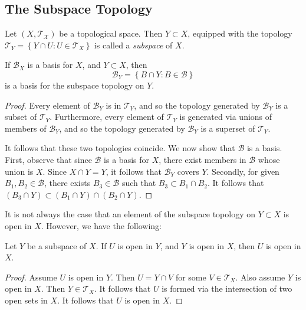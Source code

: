 \subsection{The Subspace Topology}
\begin{definition}
\label{def:subspace-top}
Let $(X, \mathcal{T_{X}})$ be a topological space. Then $Y \subset X$,
equipped with the topology $\mathcal{T}_{Y} = \left\{ Y \cap U: U \in
\mathcal{T}_{X} \right\}$ is called a \emph{subspace} of $X$.
\end{definition}
\begin{lemma}
\label{lem:basis-subspace}
If $\mathcal{B}_{X}$ is a basis for $X$, and $Y \subset X$, then
\begin{equation*}
\mathcal{B}_{Y} = \left\{ B \cap Y: B \in \mathcal{B} \right\}
\end{equation*}
is a basis for the subspace topology on $Y$.
\end{lemma}
\begin{proof}
Every element of $\mathcal{B}_{Y}$ is in $\mathcal{T}_{Y}$, and so
the topology generated by $\mathcal{B}_{Y}$ is a subset of
$\mathcal{T}_{Y}$. Furthermore, every element of $\mathcal{T}_{Y}$
is generated via unions of members of $\mathcal{B}_{Y}$, and so
the topology generated by $\mathcal{B}_{Y}$ is a superset of
$\mathcal{T}_{Y}$.

It follows that these two topologies coincide. We now show that $\mathcal{B}$
is a basis. First, observe that since $\mathcal{B}$ is a
basis for $X$, there exist members in $\mathcal{B}$ whose union is $X$. Since
$X \cap Y = Y$, it follows that $\mathcal{B}_{Y}$ covers $Y$. Secondly,
for given $B_{1}, B_{2} \in \mathcal{B}$, there exists $B_{3} \in \mathcal{B}$
such that $B_{3} \subset B_{1} \cap B_{2}$. It follows that
$\left( B_{3} \cap Y  \right)\subset (B_{1} \cap Y) \cap (B_{2} \cap Y)$.
\end{proof}
It is not always the case that an element of the subspace topology on $Y \subset
X$ is open in $X$. However, we have the following:
\begin{lemma}
\label{lem:open-criteria-subspace}
Let $Y$ be a subspace of $X$. If $U$ is open in $Y$, and $Y$ is open in
$X$, then $U$ is open in $X$.
\end{lemma}
\begin{proof}
Assume $U$ is open in $Y$. Then $U = Y \cap V$ for some $V \in
\mathcal{T}_{X}$. Also assume $Y$ is open in $X$. Then $Y \in \mathcal{T}_{X}$.
It follows that $U$ is formed via the intersection of two open sets in
$X$. It follows that $U$ is open in $X$.
\end{proof}
